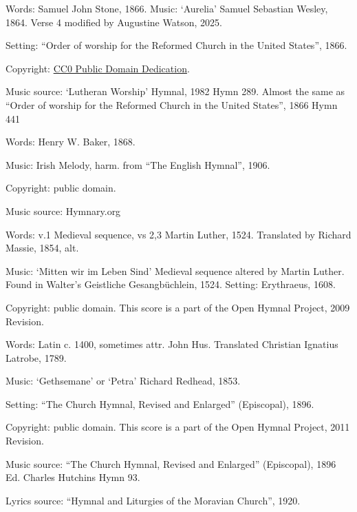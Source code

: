 \begin{multicols}{2}
\par\noindent
Words: Samuel John Stone, 1866.  Music: `Aurelia' Samuel Sebastian Wesley, 1864. Verse 4 modified by Augustine Watson, 2025.
\par\noindent
Setting: ``Order of worship for the Reformed Church in the United States'', 1866.
\par\noindent
Copyright: \href{https://creativecommons.org/publicdomain/zero/1.0/}{CC0 Public Domain Dedication}.
\par\noindent
Music source: `Lutheran Worship' Hymnal, 1982 Hymn 289. Almost the same as ``Order of worship for the Reformed Church in the United States'', 1866 Hymn 441

\par\noindent
Words: Henry W. Baker, 1868.
\par\noindent
Music: Irish Melody, harm. from ``The English Hymnal'', 1906.
\par\noindent
Copyright: public domain.
\par\noindent
Music source: Hymnary.org

\par\noindent
Words: v.1 Medieval sequence, vs 2,3 Martin Luther, 1524.  Translated by Richard Massie, 1854, alt. 
\par\noindent
Music: `Mitten wir im Leben Sind' Medieval sequence altered by Martin Luther. Found in Walter's Geistliche Gesangbüchlein, 1524.  Setting: Erythraeus, 1608.
\par\noindent
Copyright: public domain. This score is a part of the Open Hymnal Project, 2009 Revision.

\par\noindent
Words: Latin c. 1400, sometimes attr. John Hus.  Translated Christian Ignatius Latrobe, 1789. 
\par\noindent
Music: `Gethsemane' or `Petra' Richard Redhead, 1853. 
\par\noindent
Setting: ``The Church Hymnal, Revised and Enlarged'' (Episcopal), 1896.
\par\noindent
Copyright: public domain. This score is a part of the Open Hymnal Project, 2011 Revision.
\par\noindent
Music source: ``The Church Hymnal, Revised and Enlarged'' (Episcopal), 1896  Ed. Charles Hutchins Hymn 93. 
\par\noindent
Lyrics source:  ``Hymnal and Liturgies of the Moravian Church'', 1920.


\end{multicols}

